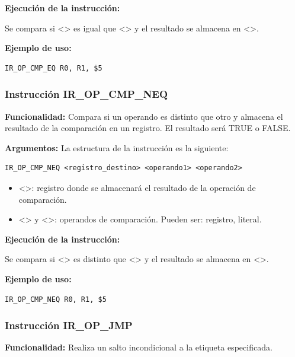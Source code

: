 \noindent
\textbf{Ejecución de la instrucción:}
\vspace{0.3cm}

\noindent
Se compara si <> es igual que <> y el resultado se almacena en <>.
\vspace{0.3cm}

\noindent
\textbf{Ejemplo de uso:}
\begin{verbatim}
IR_OP_CMP_EQ R0, R1, $5
\end{verbatim}

\subsubsection{Instrucción IR\_OP\_CMP\_NEQ}\label{subsubsec:IR_OP_CMP_NEQ}
\noindent
\textbf{Funcionalidad:} Compara si un operando es distinto que otro y almacena el resultado de la comparación en un registro. El resultado será TRUE o FALSE.

\noindent
\textbf{Argumentos:} La estructura de la instrucción es la siguiente:
\begin{verbatim}
IR_OP_CMP_NEQ <registro_destino> <operando1> <operando2>
\end{verbatim}
\begin{itemize}
    \item <>: registro donde se almacenará el resultado de la operación de comparación.
    \item <> y <>: operandos de comparación. Pueden ser: registro, literal.
\end{itemize}

\noindent
\textbf{Ejecución de la instrucción:}
\vspace{0.3cm}

\noindent
Se compara si <> es distinto que <> y el resultado se almacena en <>.
\vspace{0.3cm}

\noindent
\textbf{Ejemplo de uso:}
\begin{verbatim}
IR_OP_CMP_NEQ R0, R1, $5
\end{verbatim}

\subsubsection{Instrucción IR\_OP\_JMP}\label{subsubsec:IR_OP_JMP}
\noindent
\textbf{Funcionalidad:} Realiza un salto incondicional a la etiqueta especificada.

